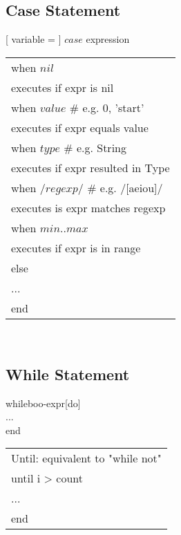 \subsection*{Case Statement}
[ variable =  ] $case$ expression \\
\begin{tabular}{ l }
\rowcolor{Gray}
when $nil$ \\
\rowcolor{Gray}
\phantom{1}\hspace{4mm}executes if expr is nil \\
when $value$ \# e.g. 0, 'start' \\
\phantom{1}\hspace{4mm}executes if expr equals value \\
\rowcolor{Gray}
when $type$ \# e.g. String \\
\rowcolor{Gray}
\phantom{1}\hspace{4mm}executes if expr resulted in Type \\
when $/regexp/$ \# e.g. /[aeiou]/ \\
\phantom{1}\hspace{4mm}executes is expr matches regexp \\
\rowcolor{Gray}
when $min..max$ \\
\rowcolor{Gray}
\phantom{1}\hspace{4mm}executes if expr is in range \\
else \\
\phantom{1}\hspace{4mm}... \\
\rowcolor{Gray}
end \\
\end{tabular}
\\

\subsection*{While Statement}
while\hspace{2mm}boo-expr\hspace{2mm}[do] \\
\phantom{1}\hspace{4mm}... \\
end \\
\begin{tabular}{ l }
\rowcolor{Gray}
Until: equivalent to "while not"\phantom{space}\\
until i > count \\
\phantom{1}\hspace{4mm}... \\
end \\
\end{tabular}
\\

